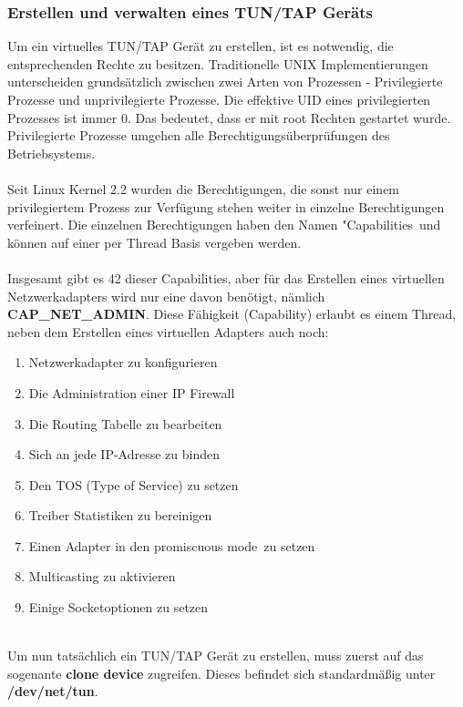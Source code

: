 \subsubsection{Erstellen und verwalten eines TUN/TAP Geräts}
Um ein virtuelles TUN/TAP Gerät zu erstellen, ist es notwendig, die entsprechenden Rechte zu besitzen. Traditionelle UNIX Implementierungen unterscheiden grundsätzlich zwischen zwei Arten von Prozessen -  Privilegierte Prozesse und unprivilegierte Prozesse. Die effektive UID eines privilegierten Prozesses ist immer 0. Das bedeutet, dass er mit root Rechten gestartet wurde. Privilegierte Prozesse umgehen alle Berechtigungsüberprüfungen des Betriebsystems. 
\\\\
Seit Linux Kernel 2.2 wurden die Berechtigungen, die sonst nur einem privilegiertem Prozess zur Verfügung stehen weiter in einzelne Berechtigungen verfeinert. Die einzelnen Berechtigungen haben den Namen "Capabilities\dq \ und können auf einer per Thread Basis vergeben werden.
\\\\
Insgesamt gibt es 42 dieser Capabilities, aber für das Erstellen eines virtuellen Netzwerkadapters wird nur eine davon benötigt, nämlich \textbf{CAP\_NET\_ADMIN}. Diese Fähigkeit (Capability) erlaubt es einem Thread, neben dem Erstellen eines virtuellen Adapters auch noch:
\\
\begin{enumerate}
    \item Netzwerkadapter zu konfigurieren
    \item Die Administration einer IP Firewall
    \item Die Routing Tabelle zu bearbeiten
    \item Sich an jede IP-Adresse zu binden
    \item Den TOS (Type of Service) zu setzen 
    \item Treiber Statistiken zu bereinigen
    \item Einen Adapter in den \dq promiscuous mode\dq \ zu setzen
    \item Multicasting zu aktivieren
    \item Einige Socketoptionen zu setzen
\end{enumerate} 
\ \\
Um nun tatsächlich ein TUN/TAP Gerät zu erstellen, muss zuerst auf das sogenante \textbf{clone device} zugreifen. Dieses befindet sich standardmäßig unter \textbf{/dev/net/tun}.
